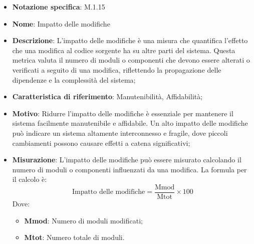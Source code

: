\begin{itemize}
    \item \textbf{Notazione specifica}: M.1.15
    \item \textbf{Nome}: Impatto delle modifiche
    \item \textbf{Descrizione}: L'impatto delle modifiche è una misura che quantifica l'effetto che una modifica al codice sorgente ha su altre parti del sistema. Questa metrica valuta il numero di moduli o componenti che devono essere alterati o verificati a seguito di una modifica, riflettendo la propagazione delle dipendenze e la complessità del sistema;
    \item \textbf{Caratteristica di riferimento}: Manutenibilità, Affidabilità;
    \item \textbf{Motivo}: Ridurre l'impatto delle modifiche è essenziale per mantenere il sistema facilmente manutenibile e affidabile. Un alto impatto delle modifiche può indicare un sistema altamente interconnesso e fragile, dove piccoli cambiamenti possono causare effetti a catena significativi;
    \item \textbf{Misurazione}: L'impatto delle modifiche può essere misurato calcolando il numero di moduli o componenti influenzati da una modifica. La formula per il calcolo è:
    \begin{equation}
    \text{Impatto delle modifiche} = \frac{\text{Mmod}}{\text{Mtot}} \times 100
    \end{equation}
    Dove:
    \begin{itemize}
        \item \textbf{Mmod}: Numero di moduli modificati;
        \item \textbf{Mtot}: Numero totale di moduli.
    \end{itemize}
\end{itemize}
